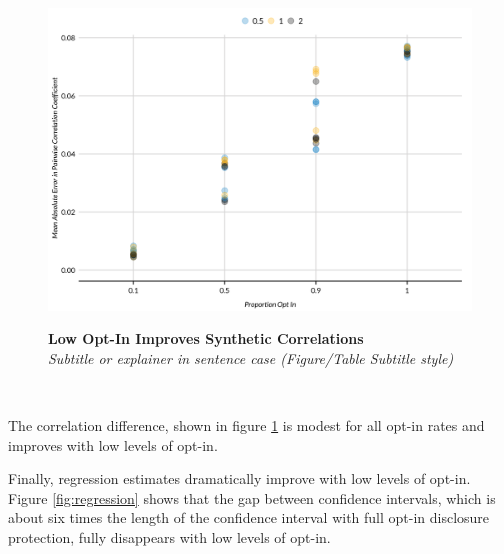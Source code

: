 \documentclass[
]{urban-formatting}
\begin{document}
\begin{figure}[htbp]
    \caption{
    \textbf{Low Opt-In Improves Synthetic Correlations}\\
    \textit{Subtitle or explainer in sentence case (Figure/Table Subtitle style)}
    }
    \centering
    \includegraphics[width=6.5in]{../analysis/figures/correlation-difference-1.png}
    \label{fig:correlation-difference}
\end{figure}
\begin{singlespace}
    \\
\end{singlespace}

The correlation difference, shown in figure
\ref{fig:correlation-difference} is modest for all opt-in rates and
improves with low levels of opt-in.

Finally, regression estimates dramatically improve with low levels of
opt-in. Figure \ref{fig:regression} shows that the gap between
confidence intervals, which is about six times the length of the
confidence interval with full opt-in disclosure protection, fully
disappears with low levels of opt-in.
\end{document}
